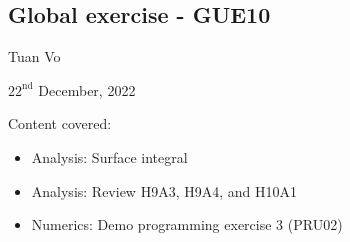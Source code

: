 \documentclass[12pt]{article}
\begin{document}
\begin{center}
	\section*{Global exercise - GUE10}
\end{center}
\begin{center}
	Tuan Vo
\end{center}
\begin{center}
	$22^{\text{nd}}$ December, 2022
\end{center}
Content covered:
\begin{itemize}
	\item[\checkmark] Analysis: Surface integral
	\item[\checkmark] Analysis: Review H9A3, H9A4, and H10A1
	\item[\checkmark] Numerics: Demo programming exercise 3 (PRU02)
\end{itemize}
\end{document}
